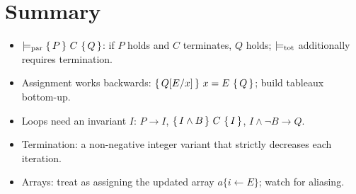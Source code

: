 \section*{Summary}
\begin{itemize}
  \item $\models_{\mathrm{par}}\{\,P\,\}\ C\ \{\,Q\,\}$: if $P$ holds and $C$ terminates, $Q$ holds;
        $\models_{\mathrm{tot}}$ additionally requires termination.
  \item Assignment works backwards: $\{\,Q[E/x]\,\}\ x=E\ \{\,Q\,\}$; build tableaux bottom-up.
  \item Loops need an invariant $I$: $P\to I$, $\{\,I\land B\,\}\ C\ \{\,I\,\}$,
        $I\land\neg B\to Q$.
  \item Termination: a non-negative integer variant that strictly decreases each iteration.
  \item Arrays: treat  as assigning the updated array $a\{i\leftarrow E\}$;
        watch for aliasing.
\end{itemize}
